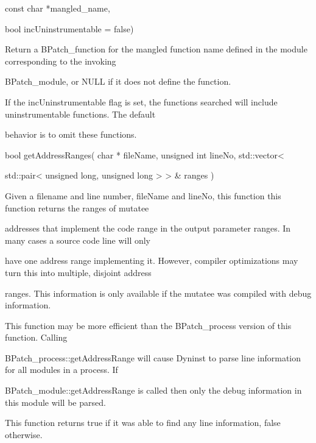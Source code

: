 {

const char *mangled_name,}



{

bool incUninstrumentable = false)}



{

Return a BPatch_function for the mangled function name defined in the module corresponding to the invoking

BPatch_module, or NULL if it does not define the function.



{

If the incUninstrumentable flag is set, the functions searched will include uninstrumentable functions. The default

behavior is to omit these functions.}



{

bool getAddressRanges( char * fileName, unsigned int lineNo, std::vector<

std::pair< unsigned long, unsigned long > > & ranges )}



{

Given a filename and line number, fileName and lineNo, this function this function returns the ranges of mutatee

addresses that implement the code range in the output parameter ranges. In many cases a source code line will only

have one address range implementing it. However, compiler optimizations may turn this into multiple, disjoint address

ranges. This information is only available if the mutatee was compiled with debug information.}



{

This function may be more efficient than the BPatch_process version of this function. Calling

BPatch_process::getAddressRange will cause Dyninst to parse line information for all modules in a process. If

BPatch_module::getAddressRange is called then only the debug information in this module will be parsed.}



{

This function returns true if it was able to find any line information, false otherwise.}



}
